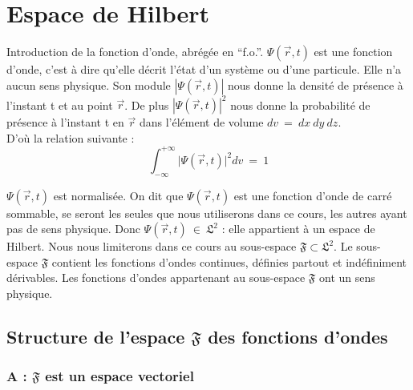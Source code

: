 \documentclass[12pt,a4paper,titlepage]{book}
\begin{document}
\section{Espace de Hilbert}
Introduction de la fonction d'onde, abrégée en \enquote{f.o.}. $\Psi (\overrightarrow{r}, t)$ est une fonction d'onde, c'est à dire qu'elle décrit l'état d'un système ou d'une particule. Elle n'a aucun sens physique. Son module $|\Psi (\overrightarrow{r}, t) |$ nous donne la densité de présence à l'instant t et au point $\overrightarrow{r}$. De plus $|\Psi (\overrightarrow{r}, t)|^2$ nous donne la probabilité de présence à l'instant t en $\overrightarrow{r}$ dans l'élément de volume $dv ~=~ dx~dy~dz$.\\

D'où la relation suivante :\\
\begin{equation*}
\int_{-\infty}^{+\infty} \vert \Psi (\overrightarrow{r}, t) \vert ^2 dv ~=~ 1
\end{equation*}

$\Psi (\overrightarrow{r}, t)$ est normalisée. On dit que $\Psi (\overrightarrow{r}, t)$ est une fonction d'onde de carré sommable, se seront les seules que nous utiliserons dans ce cours, les autres ayant pas de sens physique. Donc $\Psi (\overrightarrow{r}, t) ~\in~ \mathfrak{L}^2$ : elle appartient à un espace de Hilbert. Nous nous limiterons dans ce cours au sous-espace $\mathfrak{F} \subset \mathfrak{L}^2$. Le sous-espace $\mathfrak{F}$ contient les fonctions d'ondes continues, définies partout et indéfiniment dérivables. Les fonctions d'ondes appartenant au sous-espace $\mathfrak{F}$ ont un sens physique.

\subsection{Structure de l'espace $\mathfrak{F}$ des fonctions d'ondes}
\subsubsection{A : $\mathfrak{F}$ est un espace vectoriel}
\end{document}
